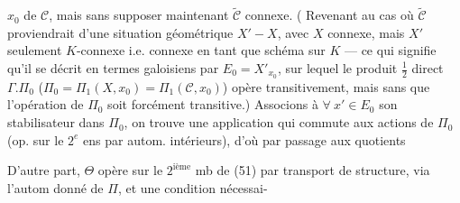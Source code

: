 $x_0$ de $\mathcal C$, mais sans supposer maintenant $\widetilde{\mathcal C}$ connexe. ( Revenant au cas où $\widetilde{\mathcal C}$ proviendrait d'une situation géométrique $X'\mathbin{-}X$, avec $X$ connexe,  mais $X'$ seulement $K$-connexe i.e. connexe en tant que schéma sur $K$ --- ce qui signifie qu'il  se décrit en termes galoisiens par $E_0=X'_{x_0}$, sur lequel le produit $\frac12$ direct $\Gamma.\Pi_0$ ($\Pi_0=\Pi_1(X,x_0)=\Pi_1(\mathcal C,x_0)$) opère transitivement, mais sans que l'opération de $\Pi_0$ soit forcément transitive.) Associons à $\forall\ x'\in E_0$ son stabilisateur dans $\Pi_0$, on trouve une application
qui commute aux actions de $\Pi_0$ (op. sur le $2^e$ ens par autom. intérieurs), d'où par passage aux quotients

D'autre part, $\Theta$ opère sur le $2^{\text{ième}}$ mb de (51) par transport de structure, via l'autom donné de $\Pi$, et  une condition nécessai-
